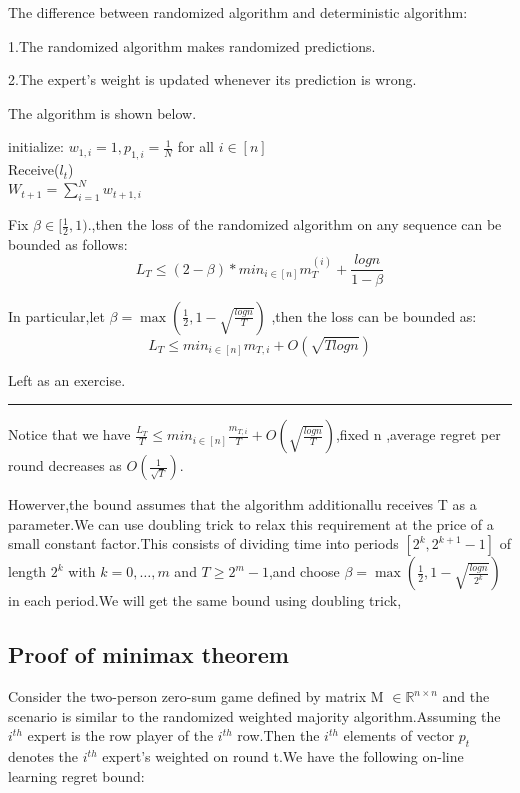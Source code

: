 \documentclass[twoside]{article}
\newenvironment{proof}{{\bf Proof:}}{\hfill\rule{2mm}{2mm}}
\begin{document}
The difference between randomized algorithm and deterministic algorithm:

1.The randomized algorithm makes randomized predictions.

2.The expert's weight is updated whenever its prediction is wrong.


The algorithm is shown below.
\begin{algorithm}
\caption{Randomized multiplicative weight updating}

initialize:  $w_{1, i} = 1,p_{1,i} =\frac{1}{N}$ for all $i \in [n]$\\
 {
    Receive($l_t$)\\
$W_{t+1}=\sum\limits_{i=1}^{N}w_{t+1,i}$\\
}
\end{algorithm}


\theorem{}
	
Fix $\beta \in [\frac{1}{2},1).$,then the loss of the randomized algorithm on any sequence can be bounded as follows:
$$L_T \leqslant (2-\beta)*min_{i \in [n]} m_T^{(i)} + \frac{logn}{1-\beta}$$

In particular,let $\beta =\max(\frac{1}{2}, 1 - \sqrt{\frac{logn}{T}})$ ,then the loss can be bounded as:
$$L_T \leqslant min_{i \in [n]}m_{T,i} + O(\sqrt{Tlogn})$$

\begin{proof}
Left as an exercise.
\end{proof}

Notice that we have $\frac{L_T}{T} \leqslant min_{i \in [n]}\frac{m_{T,i}}{T} + O(\sqrt{\frac{logn}{T}})$,fixed n ,average regret per round decreases as $O(\frac{1}{\sqrt{T}})$.

Howerver,the bound assumes that the algorithm additionallu receives T as a parameter.We can use  doubling trick to relax this requirement at the price of a small constant factor.This consists of dividing time into periods $[2^k,2^{k+1}-1]$ of length $2^k$ with $k=0,\dots,m$ and $T \ge 2^m-1$,and choose $\beta=\max(\frac{1}{2}, 1 - \sqrt{\frac{logn}{2^k}})$ in each period.We will get the same bound using doubling trick,


\subsection{Proof of minimax theorem}
\theorem{}Consider the two-person zero-sum game defined by matrix M $\in \mathbb{R}^{n \times n}$ and the scenario is similar to the randomized weighted majority algorithm.Assuming the $i^{th}$ expert is the row player of the $i^{th}$ row.Then the $i^{th}$ elements of vector $p_t$ denotes the $i^{th}$ expert's weighted on round t.We have the following on-line learning regret bound:
\end{document}
